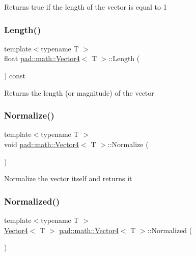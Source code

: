 Returns true if the length of the vector is equal to 1 \mbox{\label{structpad_1_1math_1_1_vector4_ac374b52275efc5f8e8b988e347fc340e}} 
\subsubsection{\texorpdfstring{Length()}{Length()}}
{\footnotesize\ttfamily template$<$typename T $>$ \\
float \mbox{\hyperlink{structpad_1_1math_1_1_vector4}{pad\+::math\+::\+Vector4}}$<$ T $>$\+::Length (\begin{DoxyParamCaption}{ }\end{DoxyParamCaption}) const}

Returns the length (or magnitude) of the vector \mbox{\label{structpad_1_1math_1_1_vector4_ae79f5cf216a4270769bfb88a54d0541d}} 
\subsubsection{\texorpdfstring{Normalize()}{Normalize()}}
{\footnotesize\ttfamily template$<$typename T $>$ \\
void \mbox{\hyperlink{structpad_1_1math_1_1_vector4}{pad\+::math\+::\+Vector4}}$<$ T $>$\+::Normalize (\begin{DoxyParamCaption}{ }\end{DoxyParamCaption})}

Normalize the vector itself and returns it \mbox{\label{structpad_1_1math_1_1_vector4_a984da7891140213ff81038628beae587}} 
\subsubsection{\texorpdfstring{Normalized()}{Normalized()}}
{\footnotesize\ttfamily template$<$typename T $>$ \\
\mbox{\hyperlink{structpad_1_1math_1_1_vector4}{Vector4}}$<$ T $>$ \mbox{\hyperlink{structpad_1_1math_1_1_vector4}{pad\+::math\+::\+Vector4}}$<$ T $>$\+::Normalized (\begin{DoxyParamCaption}{ }\end{DoxyParamCaption})}

